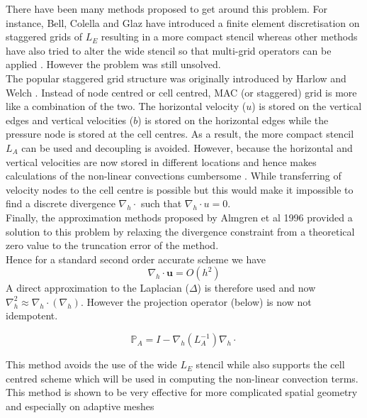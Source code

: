 There have been many methods proposed to get around this problem. For instance, Bell, Colella and Glaz have introduced a finite element discretisation on staggered grids \cite{bell1989second} of $\textit{L}_E$ resulting in a more compact stencil whereas other methods have also tried to alter the wide stencil so that multi-grid operators can be applied \cite{howell1997adaptive}. However the problem was still unsolved.\\

The popular staggered grid structure was originally introduced by Harlow and Welch \cite{harlow1965numerical}. Instead of node centred or cell centred, MAC (or staggered) grid is more like a combination of the two. The horizontal velocity ($\textit{u}$) is stored on the vertical edges and vertical velocities ($\textit{b}$) is stored on the horizontal edges while the pressure node is stored at the cell centres. As a result, the more compact stencil $\textit{L}_A$ can be used and decoupling is avoided. However, because the horizontal and vertical velocities are now stored in different locations and hence makes calculations of the non-linear convections cumbersome \cite{almgren1996numerical,howell1997adaptive}. While transferring of velocity nodes to the cell centre is possible but this would make it impossible to find a discrete divergence $\nabla_h\cdot$ such that $\nabla_h \cdot \textit{u} = 0$.\\

Finally, the approximation methods proposed by Almgren et al 1996 \cite{almgren1996numerical} provided a solution to this problem by relaxing the divergence constraint from a theoretical zero value to the truncation error of the method. \\
Hence for a standard second order accurate scheme we have
\begin{equation*}
\nabla_h \cdot \textbf{u} = O(h^2)
\end{equation*}
A direct approximation to the Laplacian ($\Delta$) is therefore used and now $\nabla_h^2\approx \nabla_h \cdot (\nabla_h)$. However the projection operator (below) is now not idempotent.
\begin{mydef}
\begin{equation}\label{eq: definition of approximate projection method}
\mathbb{P}_A = I - \nabla_h(L_A^{-1})\nabla_h \cdot
\end{equation}
\end{mydef}
This method avoids the use of the wide $\textit{L}_E$ stencil while also supports the cell centred scheme which will be used in computing the non-linear convection terms. This method is shown to be very effective for more complicated spatial geometry and especially on adaptive meshes \cite{howell1997adaptive}\\

